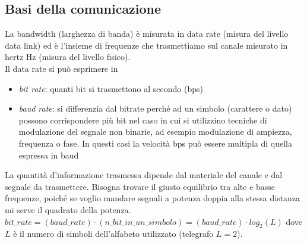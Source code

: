 \documentclass[10pt,a4paper,twoside]{article}
\begin{document}
\subsection{Basi della comunicazione}
La bandwidth (larghezza di banda) è misurata in data rate (misura del livello data link) ed è l'insieme di frequenze che trasmettiamo sul canale misurato in hertz Hz (misura del livello fisico).\\
Il data rate si può esprimere in
\begin{itemize}
\item \textit{bit rate}: quanti bit si trasmettono al secondo (bps)
\item \textit{baud rate}: si differenzia dal bitrate perché ad un simbolo (carattere o dato) possono corrispondere più bit nel caso in cui si utilizzino tecniche di modulazione del segnale non binarie, ad esempio modulazione di ampiezza, frequenza o fase. In questi casi la velocità bps può essere multipla di quella espressa in baud
\end{itemize}
La quantità d'informazione trasmessa dipende dal materiale del canale e dal segnale da trasmettere. Bisogna trovare il giusto equilibrio tra alte e basse frequenze, poiché se voglio mandare segnali a potenza doppia alla stessa distanza mi serve il quadrato della potenza.\\
$bit\_rate=(baud\_rate)\cdot (n\_bit\_in\_un\_simbolo)=(baud\_rate)\cdot log_2(L)$ dove $L$ è il numero di simboli dell'alfabeto utilizzato (telegrafo $L=2$).
\end{document}

